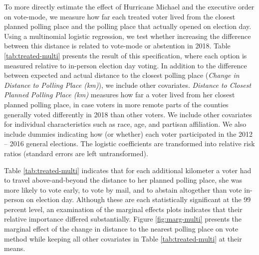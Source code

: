 \documentclass[
  12pt,
]{article}
\begin{document}
To more directly estimate the effect of Hurricane Michael and the executive order on vote-mode, we measure how far each treated voter lived from the closest planned polling place and the polling place that actually opened on election day. Using a multinomial logistic regression, we test whether increasing the difference between this distance is related to vote-mode or abstention in 2018. Table \ref{tab:treated-multi} presents the result of this specification, where each option is measured relative to in-person election day voting. In addition to the difference between expected and actual distance to the closest polling place (\emph{Change in Distance to Polling Place (km)}), we include other covariates. \emph{Distance to Closest Planned Polling Place (km)} measures how far a voter lived from her closest planned polling place, in case voters in more remote parts of the counties generally voted differently in 2018 than other voters. We include other covariates for individual characteristics such as race, age, and partisan affiliation. We also include dummies indicating how (or whether) each voter participated in the 2012 -- 2016 general elections. The logistic coefficients are transformed into relative risk ratios (standard errors are left untransformed).

\begin{singlespace}

\end{singlespace}

Table \ref{tab:treated-multi} indicates that for each additional kilometer a voter had to travel above-and-beyond the distance to her planned polling place, she was more likely to vote early, to vote by mail, and to abstain altogether than vote in-person on election day. Although these are each statistically significant at the 99 percent level, an examination of the marginal effects plots indicates that their relative importance differed substantially. Figure \ref{fig:marg-multi} presents the marginal effect of the change in distance to the nearest polling place on vote method while keeping all other covariates in Table \ref{tab:treated-multi} at their means.
\end{document}
